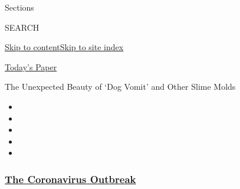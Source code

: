 Sections

SEARCH

\protect\hyperlink{site-content}{Skip to
content}\protect\hyperlink{site-index}{Skip to site index}

\href{https://myaccount.nytimes3xbfgragh.onion/auth/login?response_type=cookie\&client_id=vi}{}

\href{https://www.nytimes3xbfgragh.onion/section/todayspaper}{Today's
Paper}

The Unexpected Beauty of `Dog Vomit' and Other Slime Molds

\begin{itemize}
\item
\item
\item
\item
\item
\end{itemize}

\hypertarget{the-coronavirus-outbreak}{%
\subsubsection{\texorpdfstring{\href{https://www.nytimes3xbfgragh.onion/news-event/coronavirus?name=styln-coronavirus-national\&region=TOP_BANNER\&block=storyline_menu_recirc\&action=click\&pgtype=Article\&impression_id=1d0d90d0-f1be-11ea-b289-89f7aaa81ae4\&variant=undefined}{The
Coronavirus
Outbreak}}{The Coronavirus Outbreak}}\label{the-coronavirus-outbreak}}

